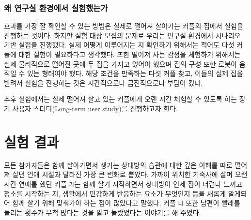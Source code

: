 
\subsubsection{왜 연구실 환경에서 실험했는가}

 효과를 가장 잘 확인할 수 있는 방법은 실제로 떨어져 살아가는 커플의 집에서 실험을 진행하는 것이다. 하지만 실험 대상 모집의 문제로 우리는 연구실 환경에서 시나리오 기반 실험을 진행했다. 실제 \concept\가 어떻게 이루어지는 지 확인하기 위해서는 적어도 다섯 커플에 대한 실험이 필요하다고 생각했다. 또한 떨어져 사는 감정을 체험하기 위해서는 실제 물리적으로 떨어진 곳에 두 집을 가지고 있어야 했으며 집의 구성 또한 로봇이 움직일 수 있는 형태여야 했다. 해당 조건을 만족하는 다섯 커플 찾고, 이들의 실제 집을 빌려서 실험을 진행하는 것은 시간적으로나 금전적으로나 부담이 컸다.

추후 실험에서는 실제 떨어져 살고 있는 커플에게 \sysname\을 오랜 시간 체험할 수 있도록 하는 장기 사용자 스터디(Long-term user study)를 진행하고자 한다.


\section{실험 결과}




모든 참가자들은 함께 살아가면서 생기는 상대방의 습관에 대한 깊은 이해를 따로 떨어져 살던 연애 시절과 달라진 가장 큰 변화로 뽑았다. 가까이 위치한 기숙사에 살며 오랜시간 연애를 했던 커플 \texttt{가}는 함께 살기 시작하면서 상대방이 언제 집이 더럽다 느끼고 청소를 시작하는 지, 생활에서 민감하게 반응하는 요소가 무엇인지 등을 새롭게 알게되어 함께 살기 위해 맞춰가야 하는 점이 많았다고 말했다. 커플 \texttt{나} 또한 남편이 빨래를 돌리는 횟수가 무척 많다는 것을 알고 놀랐었다는 이야기를 해 주었다.


